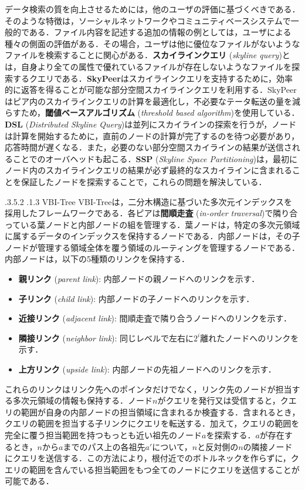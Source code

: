 \documentclass{jarticle}
\makeatletter
\renewcommand{\subsubsection}{\@startsection{subsubsection}{3}{\z@}%
   {.3\Cvs \@plus.5\Cvs \@minus.2\Cvs}%
   {.1\Cvs \@plus.3\Cvs}%
   {\reset@font\normalsize\bfseries}}
\makeatother
\begin{document}
{データ検索の質を向上させるためには，他のユーザの評価に基づくべきである．そのような特徴は，ソーシャルネットワークやコミュニティベースシステムで一般的である．ファイル内容を記述する追加の情報の例としては，ユーザによる種々の側面の評価がある．その場合，ユーザは他に優位なファイルがないようなファイルを検索することに関心がある．\textbf{スカイラインクエリ} (\textit{skyline query})とは，自身より全ての属性で優れているファイルが存在しないようなファイルを探索するクエリである．\textbf{SkyPeer}はスカイラインクエリを支持するために，効率的に返答を得ることが可能な部分空間スカイラインクエリを利用する．SkyPeerはピア内のスカイラインクエリの計算を最適化し，不必要なテータ転送の量を減らすため，\textbf{閾値ベースアルゴリズム} (\textit{threshold based algorithm})を使用している．\textbf{DSL} (\textit{Distributed Skyline Query})は並列にスカイラインの探索を行うが，ノードは計算を開始するために，直前のノードの計算が完了するのを待つ必要があり，応答時間が遅くなる．また，必要のない部分空間スカイラインの結果が送信されることでのオーバヘッドも起こる．\textbf{SSP} (\textit{Skyline Space Partitioning})は，最初にノード内のスカイラインクエリの結果が必ず最終的なスカイラインに含まれることを保証したノードを探索することで，これらの問題を解決している．


\subsubsection{VBI-Tree}
VBI-Treeは，二分木構造に基づいた多次元インデックスを採用したフレームワークである．各ピアは\textbf{間順走査} (\textit{in-order traversal})で隣り合っている葉ノードと内部ノードの組を管理する．葉ノードは，特定の多次元領域に属するデータのインデックスを保持するノードである．内部ノードは，その子ノードが管理する領域全体を覆う領域のルーティングを管理するノードである．内部ノードは，以下の5種類のリンクを保持する．
\begin{itemize}
  \item\textbf{親リンク} (\textit{parent link}): 内部ノードの親ノードへのリンクを示す．
  \item\textbf{子リンク} (\textit{child link}): 内部ノードの子ノードへのリンクを示す．
  \item\textbf{近接リンク} (\textit{adjacent link}): 間順走査で隣り合うノードへのリンクを示す．
  \item\textbf{隣接リンク} (\textit{neighbor link}): 同じレベルで左右に$2^i$離れたノードへのリンクを示す．
  \item\textbf{上方リンク} (\textit{upside link}): 内部ノードの先祖ノードへのリンクを示す．
\end{itemize}
これらのリンクはリンク先へのポインタだけでなく，リンク先のノードが担当する多次元領域の情報も保持する．ノード$n$がクエリを発行又は受信すると，クエリの範囲が自身の内部ノードの担当領域に含まれるか検査する．含まれるとき，クエリの範囲を担当する子リンクにクエリを転送する．加えて，クエリの範囲を完全に覆う担当範囲を持つもっとも近い祖先のノード$a$を探索する．$a$が存在するとき，$n$から$a$までのパス上の各祖先$a'$について，$n$と反対側の$n$の隣接ノードにクエリを送信する．この方法により，根付近でのボトルネックを作らずに，クエリの範囲を含んでいる担当範囲をもつ全てのノードにクエリを送信することが可能である．

}
\end{document}
